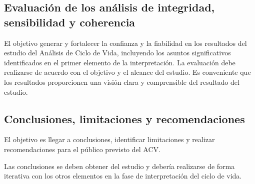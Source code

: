 \subsection{Evaluación de los análisis de integridad, sensibilidad y coherencia}

El objetivo generar y fortalecer la confianza y la fiabilidad en los resultados del estudio del Análisis de Ciclo de Vida, incluyendo los asuntos significativos identificados en el primer elemento de la interpretación. La evaluación debe realizarse de acuerdo con el objetivo y el alcance del estudio. Es conveniente que los resultados proporcionen una visión clara y comprensible del resultado del estudio.

\subsection{Conclusiones, limitaciones y recomendaciones}

El objetivo es llegar a conclusiones, identificar limitaciones y realizar recomendaciones para el público previsto del ACV.

Las conclusiones se deben obtener del estudio y debería realizarse de forma iterativa con los otros elementos en la fase de interpretación del ciclo de vida.
